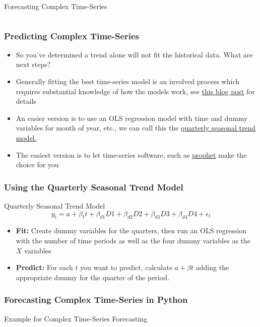 \documentclass[handout, 11pt]{beamer}
\begin{document}
\begin{section}{Forecasting Complex Time-Series}
\begin{frame}
\begin{columns}
\end{columns}
\end{frame}
\begin{frame}
\frametitle{Predicting Complex Time-Series}
\begin{itemize}
\item So you've determined a trend alone will not fit the historical data. What are next steps?
\vfill
\item Generally fitting the best time-series model is an involved process which requires substantial knowledge of how the models work, see
\textcolor{blue}{\underline{\href{https://www.seanabu.com/2016/03/22/time-series-seasonal-ARIMA-model-in-python/}{this blog post}}}
for details
\vfill
\item An easier version is to use an OLS regression model with time and dummy variables for month of year, etc., we can call this the 
\underline{quarterly seasonal trend model.}
\vfill
\item The easiest version is to let time-series software, such as
\textcolor{blue}{\underline{\href{https://facebook.github.io/prophet/docs/quick\_start.html}{prophet}}}
make the choice for you
\end{itemize}
\end{frame}
\begin{frame}
\frametitle{Using the Quarterly Seasonal Trend Model}
\begin{block}{Quarterly Seasonal Trend Model}
\begin{equation}
	y_t = a + \beta_t t + \beta_{d1} D1 + \beta_{d2} D2 + \beta_{d3} D3 + \beta_{d4} D4  + \epsilon_t
\end{equation}
\end{block}
\vfill
\begin{itemize}
\item \textbf{Fit:}
Create dummy variables for the quarters, then run an OLS regression with the number of time periods as well as the four dummy variables as the $X$ variables
\vfill
\item \textbf{Predict:}
For each $t$ you want to predict, calculate $a + \beta t$ adding the appropriate dummy for the quarter of the period.
\end{itemize}
\end{frame}
\begin{frame}
\frametitle{Forecasting Complex Time-Series in Python}
{
\begin{block}{Example for Complex Time-Series Forecasting}
\begin{itemize}

\end{itemize}
\end{block}}
\end{frame}
\end{section}
\end{document}
